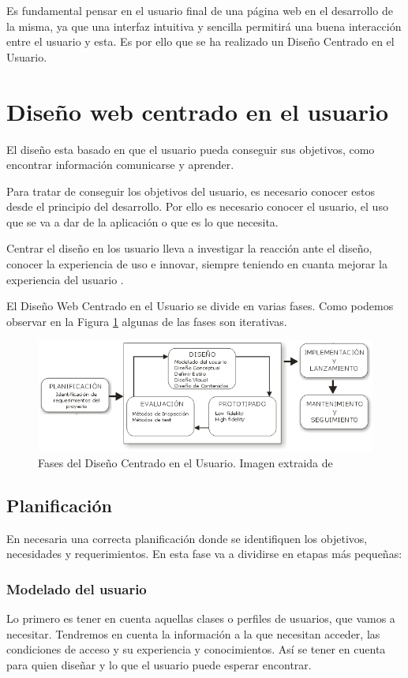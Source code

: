 
Es fundamental pensar en el usuario final de una página web en el desarrollo de la misma, ya que una interfaz intuitiva y sencilla permitirá una buena interacción entre el usuario y esta. Es por ello que se ha realizado un Diseño Centrado en el Usuario.
\section{Diseño web centrado en el usuario}
El diseño esta basado en que el usuario pueda conseguir sus objetivos, como encontrar información comunicarse y aprender.

Para tratar de conseguir los objetivos del usuario, es necesario conocer estos desde el principio del desarrollo. Por ello es necesario conocer el usuario, el uso que se va a dar de la aplicación o que es lo que necesita.

Centrar el diseño en los usuario lleva a investigar la reacción ante el diseño, conocer la experiencia de uso e innovar, siempre teniendo en cuanta mejorar la experiencia del usuario \cite{diseno_centrado_usuario_2016}.

El Diseño Web Centrado en el Usuario se divide en varias fases. Como podemos observar en la Figura \ref{fig:DisCenUsu} algunas de las fases son iterativas.
\begin{figure}
\centering
\includegraphics[width=.9\textwidth]{img/diseno_centrado_usuario}
\caption[Fases del Diseño Centrado en el Usuario.]{Fases del Diseño Centrado en el Usuario. Imagen extraida de\cite{diseno_imagen}}
\label{fig:DisCenUsu}
\end{figure}
\subsection{Planificación}
En necesaria una correcta planificación donde se identifiquen los objetivos, necesidades y requerimientos. En esta fase va a dividirse en etapas más pequeñas:

\subsubsection{Modelado del usuario}
Lo primero es tener en cuenta aquellas clases o perfiles de usuarios, que vamos a necesitar. Tendremos en cuenta la información a la que necesitan acceder, las condiciones de acceso y su experiencia y conocimientos. Así se tener  en cuenta para quien diseñar y lo que el usuario puede esperar encontrar.

